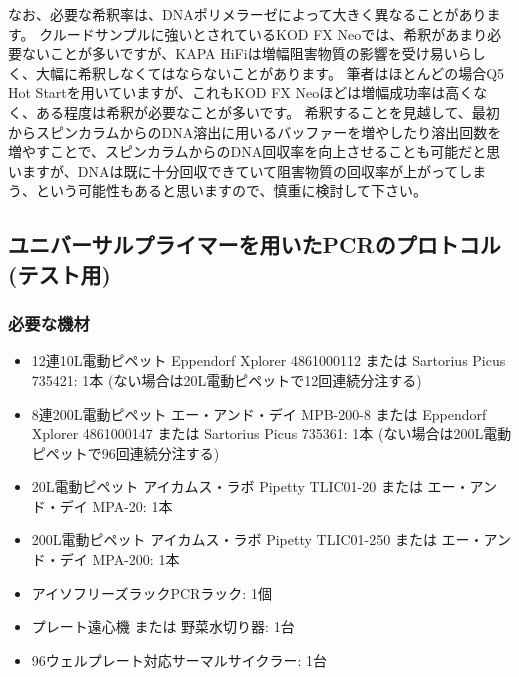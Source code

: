 \documentclass[titlepage,10pt,a4paper,uplatex]{jsbook}
\begin{document}
なお、必要な希釈率は、DNAポリメラーゼによって大きく異なることがあります。
クルードサンプルに強いとされているKOD FX Neoでは、希釈があまり必要ないことが多いですが、KAPA HiFiは増幅阻害物質の影響を受け易いらしく、大幅に希釈しなくてはならないことがあります。
筆者はほとんどの場合Q5 Hot Startを用いていますが、これもKOD FX Neoほどは増幅成功率は高くなく、ある程度は希釈が必要なことが多いです。
希釈することを見越して、最初からスピンカラムからのDNA溶出に用いるバッファーを増やしたり溶出回数を増やすことで、スピンカラムからのDNA回収率を向上させることも可能だと思いますが、DNAは既に十分回収できていて阻害物質の回収率が上がってしまう、という可能性もあると思いますので、慎重に検討して下さい。

\subsection{ユニバーサルプライマーを用いたPCRのプロトコル (テスト用)}

\subsubsection{必要な機材}
\begin{itemize}
\item 12連10{\textmu}L電動ピペット Eppendorf Xplorer 4861000112 または Sartorius Picus 735421: 1本 (ない場合は20{\textmu}L電動ピペットで12回連続分注する)
\item 8連200{\textmu}L電動ピペット エー・アンド・デイ MPB-200-8 または Eppendorf Xplorer 4861000147 または Sartorius Picus 735361: 1本 (ない場合は200{\textmu}L電動ピペットで96回連続分注する)
\item 20{\textmu}L電動ピペット アイカムス・ラボ Pipetty TLIC01-20 または エー・アンド・デイ MPA-20: 1本
\item 200{\textmu}L電動ピペット アイカムス・ラボ Pipetty TLIC01-250 または エー・アンド・デイ MPA-200: 1本
\item アイソフリーズラックPCRラック: 1個
\item プレート遠心機 または 野菜水切り器: 1台
\item 96ウェルプレート対応サーマルサイクラー: 1台
\end{itemize}
\end{document}

